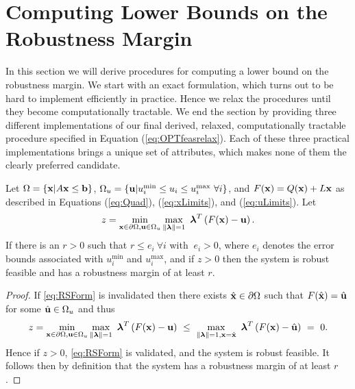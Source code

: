 \section{Computing Lower Bounds on the Robustness Margin} \label{sec:inbdform}

In this section we will derive procedures for computing a lower bound on the robustness margin. 
We start with an exact formulation, which turns out to be hard to implement efficiently in practice.
Hence we relax the procedures until they become computationally tractable. 
We end the section by providing three different implementations of our final derived, relaxed, computationally tractable procedure specified in Equation (\ref{eq:OPTfeasrelax}).
Each of these three practical implementations brings a unique set of attributes, which makes none of them the clearly preferred candidate.

\smallskip
\begin{thm}
  Let $\Omega=\{\mathbf{x}| A\mathbf{x} \leq \mathbf{b}\}$, $\Omega_{u}=\{\mathbf{u}| u^{\min}_i\leq u_i \leq u^{\max}_i \ \forall i \}$, and $F(\mathbf{x})=Q(\mathbf{x})+L\mathbf{x}$ as described in Equations (\ref{eq:Quad}), (\ref{eq:xLimits}), and (\ref{eq:uLimits}). 
  Let
  \[
  z = \min\limits_{\vx \in \partial \Omega, \vu \in \Omega_{u} }\max\limits_{\norm{\vlambda}=1}\ \vlambda^T\left(F(\vx)-\vu\right).
  \]
  If there is an $r>0$ such that $r \leq e_i \ \forall i$ with $\ e_i>0$, where $e_i$ denotes the error bounds associated with $ u^{\min}_i$ and $ u^{\max}_i$, and if $z > 0$ then the system is robust feasible and has a robustness margin of at least $r$.

  \medskip
  \begin{proof} 
    If \cref{eq:RSForm} is invalidated then there exists $\hat{\mathbf{x}} \in \partial\Omega$ such that $F(\hat{\mathbf{x}})=\hat{\mathbf{u}}$ for some $\hat{\mathbf{u}}\in\Omega_{u}$ and thus
    \[
    z = \min\limits_{\vx \in \partial \Omega, \vu \in \Omega_{u}}\max\limits_{\norm{\vlambda}=1}\ \vlambda^T\left(F(\vx)-\vu\right) ~\leq~ \max\limits_{\norm{\vlambda}=1, \vx=\hat{\vx}}\ \vlambda^T\left(F(\vx)-\hat{\vu}\right) ~=~ 0.
    \]
    Hence if $z>0$, \cref{eq:RSForm} is validated, and the system is robust feasible.
    It follows then by definition that the system has a robustness margin of at least $r$.
  \end{proof}
\end{thm}

